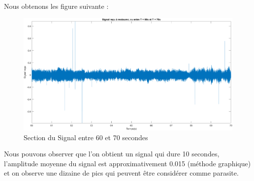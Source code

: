 \documentclass{article}
\begin{document}
Nous obtenons les figure suivante : 
\begin{figure}[!h] 	
    \centering
    \includegraphics[width=1\textwidth]{images/signaloriginecourt.png}
    \caption{Section du Signal entre 60 et 70 secondes}
    \label{fig-binaire}
\end{figure}
Nous pouvons observer que l'on obtient un signal qui dure 10 secondes, l'amplitude moyenne du signal est approximativement 0.015 (méthode graphique) et on observe une dizaine de pics qui peuvent être considérer comme parasite. \\
\end{document}
